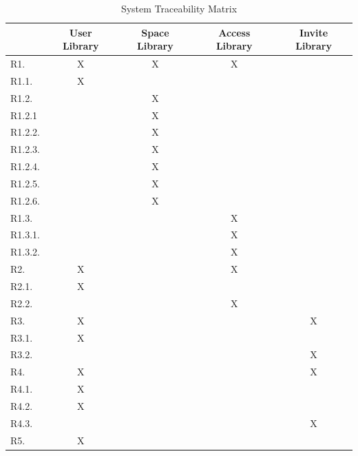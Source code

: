 \begin{table}[H]
\centering
\begin{tabular}{|l|c|c|c|c|}
\hline
        & User Library & Space Library & Access Library & Invite Library \\ \hline
R1.     & X            & X             & X              &                \\ \hline
R1.1.   & X            &               &                &                \\ \hline
R1.2.   &              & X             &                &                \\ \hline
R1.2.1  &              & X             &                &                \\ \hline
R1.2.2. &              & X             &                &                \\ \hline
R1.2.3. &              & X             &                &                \\ \hline
R1.2.4. &              & X             &                &                \\ \hline
R1.2.5. &              & X             &                &                \\ \hline
R1.2.6. &              & X             &                &                \\ \hline
R1.3.   &              &               & X              &                \\ \hline
R1.3.1. &              &               & X              &                \\ \hline
R1.3.2. &              &               & X              &                \\ \hline
R2.     & X            &               & X              &                \\ \hline
R2.1.   & X            &               &                &                \\ \hline
R2.2.   &              &               & X              &                \\ \hline
R3.     & X            &               &                & X              \\ \hline
R3.1.   & X            &               &                &                \\ \hline
R3.2.   &              &               &                & X              \\ \hline
R4.     & X            &               &                & X              \\ \hline
R4.1.   & X            &               &                &                \\ \hline
R4.2.   & X            &               &                &                \\ \hline
R4.3.   &              &               &                & X              \\ \hline
R5.     & X            &               &                &                \\ \hline
\end{tabular}
\caption{System Traceability Matrix}
\label{tab:system_traceability_matrix}
\end{table}

